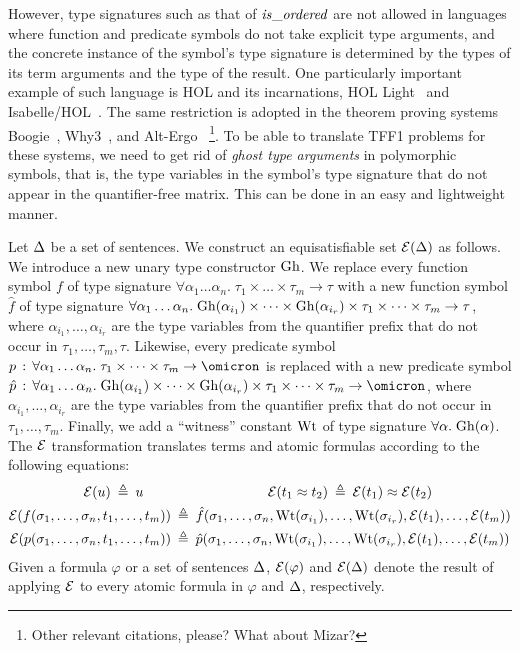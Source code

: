However, type signatures such as that of $\mathit{is\_ordered}$ are not
allowed in languages where function and predicate symbols do not take
explicit type arguments, and the concrete instance of the symbol's type
signature is determined by the types of its term arguments and the type
of the result.
One particularly important example of such language is HOL
and its incarnations, HOL Light~\cite{harrison09hollight}
and Isabelle/HOL~\cite{NipkowPaulsonWenzel2002Isabelle}.
The same restriction is adopted in the theorem proving systems
Boogie~\cite{Barnett06boogie}, Why3~\cite{boogie11why3}, and
Alt-Ergo~\cite{conchon08smt}%
\footnote{Other relevant citations, please? What about Mizar?}.
To be able to translate TFF1 problems for these systems, we need
to get rid of {\em ghost type arguments} in polymorphic symbols,
that is, the type variables in the symbol's type signature that
do not appear in the quantifier-free matrix.
This can be done in an easy and lightweight manner.

Let $\mathrm{\Delta}$ be a set of sentences.
We construct an equisatisfiable set $\mathcal{E}(\mathrm{\Delta})$ as follows.
%
We introduce a new unary type constructor $\mathrm{Gh}$.
We replace every function symbol $f$ of type signature
$\forall \alpha_1\dots\alpha_n .\; \tau_1 \times \dots \times \tau_m \to \tau$
with a new function symbol $\hat{f}$ of type signature
$\forall \alpha_1\dots\alpha_n .\;
\mathrm{Gh}(\alpha_{i_1}) \times \dots \times \mathrm{Gh}(\alpha_{i_r}) \times
\tau_1 \times \dots \times \tau_m \to \tau$,
where $\alpha_{i_1},\dots,\alpha_{i_r}$ are the type
variables from the quantifier prefix that do not occur in
$\tau_1,\dots,\tau_m,\tau$.
Likewise, every predicate symbol $p \,\ty\,
\forall \alpha_1\dots\alpha_n .\; \tau_1 \times \dots \times \tau_m \to \omicron$
is replaced with a new predicate symbol $\hat{p} \,\ty\,
\forall \alpha_1\dots\alpha_n .\;
\ghost(\alpha_{i_1}) \times \dots \times \ghost(\alpha_{i_r}) \times
\tau_1 \times \dots \times \tau_m \to \omicron$,
where $\alpha_{i_1},\dots,\alpha_{i_r}$ are the type
variables from the quantifier prefix that do not occur in
$\tau_1,\dots,\tau_m$.
Finally, we add a ``witness'' constant $\mathrm{Wt}$
of type signature $\forall \alpha.\;\mathrm{Gh}(\alpha)$.
The $\mathcal{E}$ transformation translates terms and atomic
formulas according to the following equations:
\begin{align*}
\mathcal{E}(u) \:\triangleq\: u
\quad\quad & \qquad\qquad\qquad\quad
\mathcal{E}(t_1 \approx t_2) \:\triangleq\: \mathcal{E}(t_1) \approx \mathcal{E}(t_2) \\
\mathcal{E}(f(\sigma_1,\dots,\sigma_n,t_1,\dots,t_m)) &\:\triangleq\:
\hat{f}(\sigma_1,\dots,\sigma_n,\mathrm{Wt}(\sigma_{i_1}),\dots,\mathrm{Wt}(\sigma_{i_r}),
\mathcal{E}(t_1),\dots,\mathcal{E}(t_m)) \\
\mathcal{E}(p(\sigma_1,\dots,\sigma_n,t_1,\dots,t_m)) &\:\triangleq\:
\hat{p}(\sigma_1,\dots,\sigma_n,\mathrm{Wt}(\sigma_{i_1}),\dots,\mathrm{Wt}(\sigma_{i_r}),
\mathcal{E}(t_1),\dots,\mathcal{E}(t_m))
\end{align*}
Given a formula $\varphi$ or a set of sentences $\mathrm{\Delta}$,
$\mathcal{E}(\varphi)$ and $\mathcal{E}(\mathrm{\Delta})$ denote the result of
applying $\mathcal{E}$ to every atomic formula in $\varphi$ and
$\mathrm{\Delta}$, respectively.

